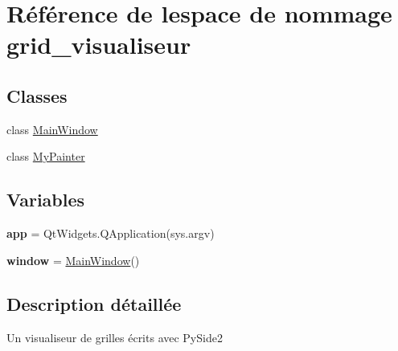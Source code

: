 \hypertarget{namespacegrid__visualiseur}{}\section{Référence de l\textquotesingle{}espace de nommage grid\+\_\+visualiseur}
\label{namespacegrid__visualiseur}
\subsection*{Classes}
\begin{DoxyCompactItemize}
\item 
class \hyperlink{classgrid__visualiseur_1_1MainWindow}{Main\+Window}
\item 
class \hyperlink{classgrid__visualiseur_1_1MyPainter}{My\+Painter}
\end{DoxyCompactItemize}
\subsection*{Variables}
\begin{DoxyCompactItemize}
\item 
\mbox{\label{namespacegrid__visualiseur_a35fe4d1eeb0349b49c8b65eb339d5b85}} 
{\bfseries app} = Qt\+Widgets.\+Q\+Application(sys.\+argv)
\item 
\mbox{\label{namespacegrid__visualiseur_a9f76e729829da85ee38fd8645e78eebb}} 
{\bfseries window} = \hyperlink{classgrid__visualiseur_1_1MainWindow}{Main\+Window}()
\end{DoxyCompactItemize}


\subsection{Description détaillée}
\begin{DoxyVerb}Un visualiseur de grilles écrits avec PySide2
\end{DoxyVerb}
 